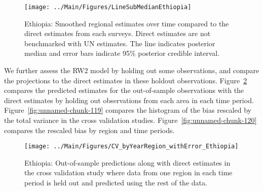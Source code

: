 \documentclass[12pt]{article}\usepackage[]{graphicx}\usepackage[]{color}
\newenvironment{knitrout}{}{} %
\begin{document}
\begin{knitrout}
\color{fgcolor}\begin{figure}[bht]

{\centering \texttt{[image: ../Main/Figures/LineSubMedianEthiopia]} 

}

\caption[Ethiopia]{Ethiopia: Smoothed regional estimates over time compared to the direct estimates from each surveys. Direct estimates are not benchmarked with UN estimates. The line indicates posterior median and error bars indicate 95\% posterior credible interval.}\label{fig:unnamed-chunk-117}
\end{figure}


\end{knitrout}
We further assess the RW2 model by holding out some observations, and compare the projections to the direct estimates in these holdout observations. Figure~\ref{fig:unnamed-chunk-118} compares the predicted estimates for the out-of-sample observations  with the direct estimates by holding out observations from each area in each time period.  Figure~\ref{fig:unnamed-chunk-119} compares the histogram of the bias rescaled by the total variance in the cross validation studies. Figure~\ref{fig:unnamed-chunk-120} compares the rescaled bias by region and time periods.



 
\begin{knitrout}
\color{fgcolor}\begin{figure}[bht]

{\centering \texttt{[image: ../Main/Figures/CV\_byYearRegion\_withError\_Ethiopia]} 

}

\caption[Ethiopia]{Ethiopia: Out-of-sample predictions along with direct estimates in the cross validation study where data from one region in each time period is held out and predicted using the rest of the data.}\label{fig:unnamed-chunk-118}
\end{figure}


\end{knitrout}
\end{document}
